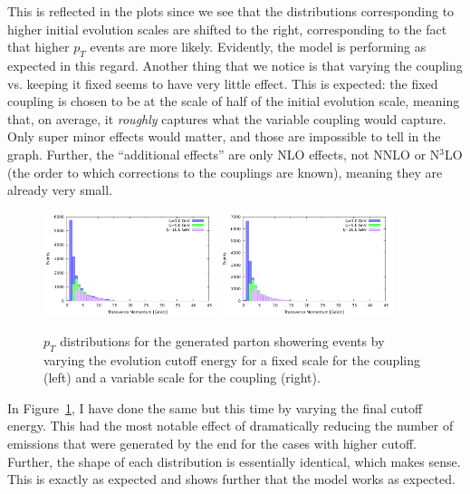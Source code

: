 This is reflected in the plots since we see that the distributions corresponding to higher initial evolution scales are shifted to the right, corresponding to the fact that higher $p_T$ events are more likely. Evidently, the model is performing as expected in this regard. Another thing that we notice is that varying the coupling vs. keeping it fixed seems to have very little effect. This is expected: the fixed coupling is chosen to be at the scale of half of the initial evolution scale, meaning that, on average, it \textit{roughly} captures what the variable coupling would capture. Only super minor effects would matter, and those are impossible to tell in the graph. Further, the ``additional effects'' are only NLO effects, not NNLO or N$^3$LO (the order to which corrections to the couplings are known), meaning they are already very small.

\begin{figure}[ht]
  \centering
  \includegraphics[width=0.45\textwidth]{./res/gfx/pt2-fixed.pdf}
  \includegraphics[width=0.45\textwidth]{./res/gfx/pt2-variable.pdf}
  \caption{$p_T$ distributions for the generated parton showering events by varying the evolution cutoff energy for a fixed scale for the coupling (left) and a variable scale for the coupling (right).}
  \label{fig:pt-dist2}
\end{figure}

In Figure~\ref{fig:pt-dist2}, I have done the same but this time by varying the final cutoff energy. This had the most notable effect of dramatically reducing the number of emissions that were generated by the end for the cases with higher cutoff. Further, the shape of each distribution is essentially identical, which makes sense. This is exactly as expected and shows further that the model works as expected.





